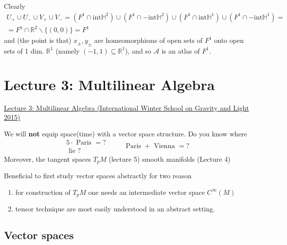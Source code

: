 Clearly 
\[
\begin{gathered}
U_+ \cup U_- \cup V_+ \cup V_- = (F^1 \cap \text{int}\mathbb{H}^2) \cup (F^1 \cap -\text{int}\mathbb{H}^2)\cup (F^1 \cap \text{int}\mathbb{H}^1) \cup (F^1 \cap -\text{int}\mathbb{H}^1) = \\
= F^1 \cap \mathbb{R}^2\backslash \lbrace (0,0) \rbrace = F^1
\end{gathered}
\]
and (the point is that) $x_{\pm},y_{\pm}$ are homeomorphisms of open sets of $F^1$ onto open sets of 1 dim. $\mathbb{R}^1$ (namely $(-1,1) \subseteq \mathbb{R}^1$), and so $\mathcal{A}$ is an atlas of $F^1$.  

\section{Lecture 3: Multilinear Algebra}

\href{https://youtu.be/mbv3T15nWq0}{Lecture 3: Multilinear Algebra (International Winter School on Gravity and Light 2015)}

We will \textbf{not} equip space(time) with a vector space structure.  Do you know where 
\[
\begin{gathered} 5 \cdot \text{ Paris } = ? \\
\text{ lie ? } \end{gathered}
\qquad \, \text{ Paris } + \text{ Vienna } = ?
\]
Moreover, the tangent spaces $T_pM$ (lecture 5) smooth manifolds (Lecture 4)

Beneficial to first study vector spaces abstractly for two reason 
\begin{enumerate}
	\item[(i)] for construction of $T_pM$ one needs an intermediate vector space $C^{\infty}(M)$
	\item[(ii)] tensor technique are most easily understood in an abstract setting.  
\end{enumerate}

\subsection{Vector spaces}

